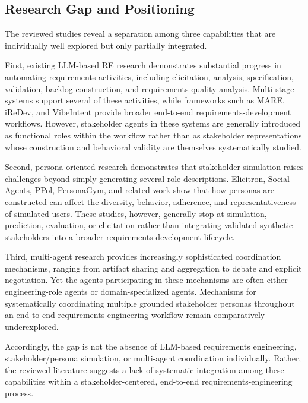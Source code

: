 \subsection{Research Gap and Positioning}
\label{sec:rw-gap}

The reviewed studies reveal a separation among three capabilities that are individually well explored but only partially integrated.

First, existing LLM-based RE research demonstrates substantial progress in automating requirements activities, including elicitation, analysis, specification, validation, backlog construction, and requirements quality analysis. Multi-stage systems support several of these activities, while frameworks such as MARE, iReDev, and VibeIntent provide broader end-to-end requirements-development workflows. However, stakeholder agents in these systems are generally introduced as functional roles within the workflow rather than as stakeholder representations whose construction and behavioral validity are themselves systematically studied.

Second, persona-oriented research demonstrates that stakeholder simulation raises challenges beyond simply generating several role descriptions. Elicitron, Social Agents, PPol, PersonaGym, and related work show that how personas are constructed can affect the diversity, behavior, adherence, and representativeness of simulated users. These studies, however, generally stop at simulation, prediction, evaluation, or elicitation rather than integrating validated synthetic stakeholders into a broader requirements-development lifecycle.

Third, multi-agent research provides increasingly sophisticated coordination mechanisms, ranging from artifact sharing and aggregation to debate and explicit negotiation. Yet the agents participating in these mechanisms are often either engineering-role agents or domain-specialized agents. Mechanisms for systematically coordinating multiple grounded stakeholder personas throughout an end-to-end requirements-engineering workflow remain comparatively underexplored.

Accordingly, the gap is not the absence of LLM-based requirements engineering, stakeholder/persona simulation, or multi-agent coordination individually. Rather, the reviewed literature suggests a lack of systematic integration among these capabilities within a stakeholder-centered, end-to-end requirements-engineering process.

